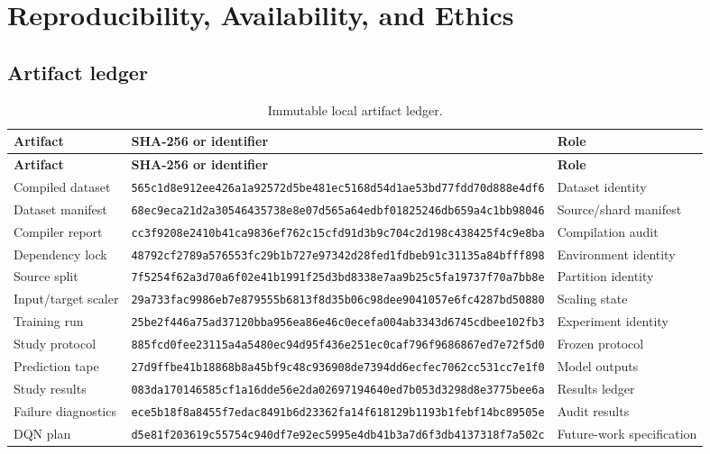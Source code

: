 \documentclass[10pt,letterpaper]{article}
\numberwithin{equation}{section}
\theoremstyle{definition}
\theoremstyle{remark}
\begin{document}
\section{Reproducibility, Availability, and Ethics}

\subsection{Artifact ledger}

\begin{longtable}{@{}p{3.1cm}p{9.4cm}p{2.2cm}@{}}
\caption{Immutable local artifact ledger.}\label{tab:artifacts}\\
\toprule
\textbf{Artifact} & \textbf{SHA-256 or identifier} & \textbf{Role}\\
\midrule
\endfirsthead
\toprule
\textbf{Artifact} & \textbf{SHA-256 or identifier} & \textbf{Role}\\
\midrule
\endhead
Compiled dataset &
\nolinkurl{565c1d8e912ee426a1a92572d5be481ec5168d54d1ae53bd77fdd70d888e4df6}
& Dataset identity\\
Dataset manifest &
\nolinkurl{68ec9eca21d2a30546435738e8e07d565a64edbf01825246db659a4c1bb98046}
& Source/shard manifest\\
Compiler report &
\nolinkurl{cc3f9208e2410b41ca9836ef762c15cfd91d3b9c704c2d198c438425f4c9e8ba}
& Compilation audit\\
Dependency lock &
\nolinkurl{48792cf2789a576553fc29b1b727e97342d28fed1fdbeb91c31135a84bfff898}
& Environment identity\\
Source split &
\nolinkurl{7f5254f62a3d70a6f02e41b1991f25d3bd8338e7aa9b25c5fa19737f70a7bb8e}
& Partition identity\\
Input/target scaler &
\nolinkurl{29a733fac9986eb7e879555b6813f8d35b06c98dee9041057e6fc4287bd50880}
& Scaling state\\
Training run &
\nolinkurl{25be2f446a75ad37120bba956ea86e46c0ecefa004ab3343d6745cdbee102fb3}
& Experiment identity\\
Study protocol &
\nolinkurl{885fcd0fee23115a4a5480ec94d95f436e251ec0caf796f9686867ed7e72f5d0}
& Frozen protocol\\
Prediction tape &
\nolinkurl{27d9ffbe41b18868b8a45bf9c48c936908de7394dd6ecfec7062cc531cc7e1f0}
& Model outputs\\
Study results &
\nolinkurl{083da170146585cf1a16dde56e2da02697194640ed7b053d3298d8e3775bee6a}
& Results ledger\\
Failure diagnostics &
\nolinkurl{ece5b18f8a8455f7edac8491b6d23362fa14f618129b1193b1febf14bc89505e}
& Audit results\\
DQN plan &
\nolinkurl{d5e81f203619c55754c940df7e92ec5995e4db41b3a7d6f3db4137318f7a502c}
& Future-work specification\\
\bottomrule
\end{longtable}
\end{document}
